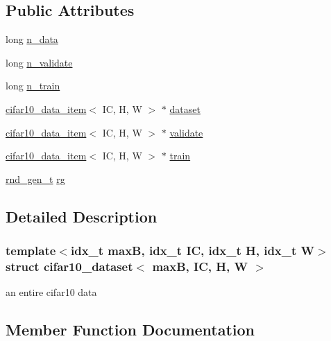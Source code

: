 \subsection*{Public Attributes}
\begin{DoxyCompactItemize}
\item 
long \hyperlink{structcifar10__dataset_a60c9f64838a155a1127912cf190b3ed0}{n\+\_\+data}
\item 
long \hyperlink{structcifar10__dataset_a0f447993bfd499e4222e66dca3e111a0}{n\+\_\+validate}
\item 
long \hyperlink{structcifar10__dataset_ac6e5dbe7c30b683d01e600901c51e010}{n\+\_\+train}
\item 
\hyperlink{structcifar10__data__item}{cifar10\+\_\+data\+\_\+item}$<$ IC, H, W $>$ $\ast$ \hyperlink{structcifar10__dataset_a8c4071c746bf18e875b9e7975c7929fd}{dataset}
\item 
\hyperlink{structcifar10__data__item}{cifar10\+\_\+data\+\_\+item}$<$ IC, H, W $>$ $\ast$ \hyperlink{structcifar10__dataset_a3264803c2eb493dabaedb7eca4d7725f}{validate}
\item 
\hyperlink{structcifar10__data__item}{cifar10\+\_\+data\+\_\+item}$<$ IC, H, W $>$ $\ast$ \hyperlink{structcifar10__dataset_a0c64c36b940f91c63a9d5f89360f5335}{train}
\item 
\hyperlink{structrnd__gen__t}{rnd\+\_\+gen\+\_\+t} \hyperlink{structcifar10__dataset_a59998ba824d0a527fe0f6e7aad0693eb}{rg}
\end{DoxyCompactItemize}


\subsection{Detailed Description}
\subsubsection*{template$<$idx\+\_\+t maxB, idx\+\_\+t IC, idx\+\_\+t H, idx\+\_\+t W$>$\newline
struct cifar10\+\_\+dataset$<$ max\+B, I\+C, H, W $>$}

an entire cifar10 data 

\subsection{Member Function Documentation}
\mbox{\label{structcifar10__dataset_afafc5833390f1f3f9c2fefea15d643ca}} 
